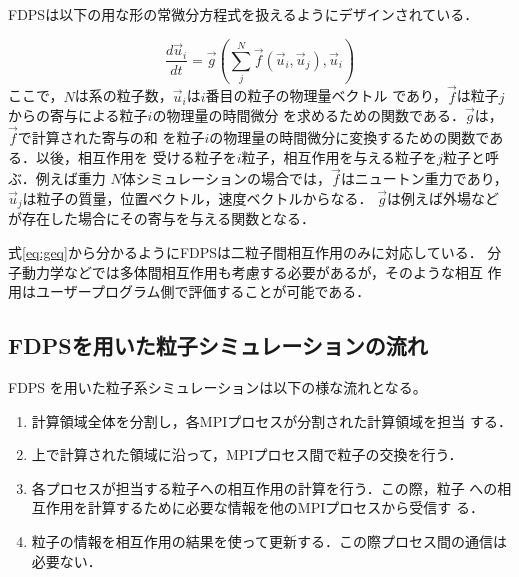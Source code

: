 \documentclass[submit,techreq,noauthor]{ipsj}
\newcommand{\myvec}[1]{\vec{#1}}
\begin{document}

FDPSは以下の用な形の常微分方程式を扱えるようにデザインされている．

\begin{equation}
  \frac{d\myvec{u}_i}{dt} = \myvec{g}\left(\sum_j^N \myvec{f}
  (\myvec{u}_i, \myvec{u}_j), \myvec{u}_i\right) \label{eq:geq}
\end{equation}
ここで，$N$は系の粒子数，$\myvec{u}_i$は$i$番目の粒子の物理量ベクトル
であり，$\myvec{f}$は粒子$j$からの寄与による粒子$i$の物理量の時間微分
を求めるための関数である．$\myvec{g}$は，$\myvec{f}$で計算された寄与の和
を粒子$i$の物理量の時間微分に変換するための関数である．以後，相互作用を
受ける粒子を$i$粒子，相互作用を与える粒子を$j$粒子と呼ぶ．例えば重力
$N$体シミュレーションの場合では，$\myvec{f}$はニュートン重力であり，
$\myvec{u}_j$は粒子の質量，位置ベクトル，速度ベクトルからなる．
$\myvec{g}$は例えば外場などが存在した場合にその寄与を与える関数となる．

式\ref{eq:geq}から分かるようにFDPSは二粒子間相互作用のみに対応している．
分子動力学などでは多体間相互作用も考慮する必要があるが，そのような相互
作用はユーザープログラム側で評価することが可能である．



\subsection{FDPSを用いた粒子シミュレーションの流れ}

FDPS を用いた粒子系シミュレーションは以下の様な流れとなる。

\begin{enumerate}
  \item 計算領域全体を分割し，各MPIプロセスが分割された計算領域を担当
    する．
  \item 上で計算された領域に沿って，MPIプロセス間で粒子の交換を行う．
  \item 各プロセスが担当する粒子への相互作用の計算を行う．この際，粒子
    への相互作用を計算するために必要な情報を他のMPIプロセスから受信す
    る．
  \item 粒子の情報を相互作用の結果を使って更新する．この際プロセス間の通信は必要ない．
\end{enumerate}
\end{document}
